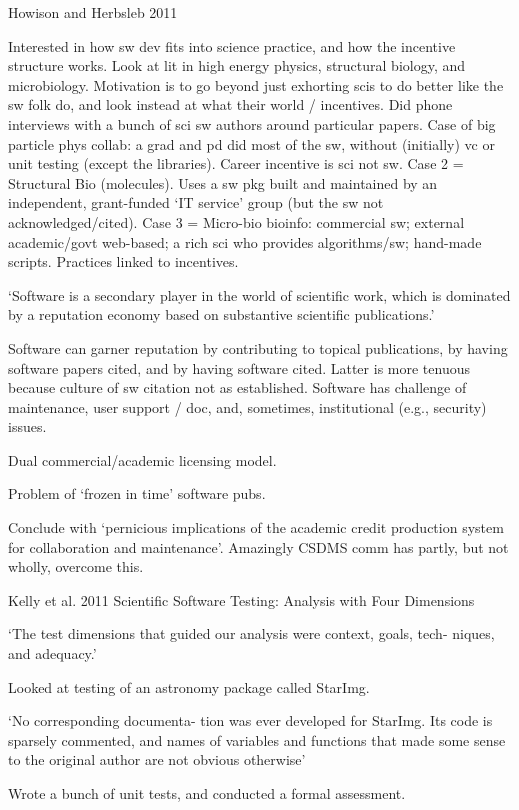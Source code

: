 \documentclass[12pt]{amsart}
\begin{document}
Howison and Herbsleb 2011

Interested in how sw dev fits into science practice, and how the incentive structure works. Look at lit in high energy physics, structural biology, and microbiology. Motivation is to go beyond just exhorting scis to do better like the sw folk do, and look instead at what their world / incentives. Did phone interviews with a bunch of sci sw authors around particular papers. Case of big particle phys collab: a grad and pd did most of the sw, without (initially) vc or unit testing (except the libraries). Career incentive is sci not sw. Case 2 = Structural Bio (molecules). Uses a sw pkg built and maintained by an independent, grant-funded `IT service' group (but the sw not acknowledged/cited). Case 3 = Micro-bio bioinfo: commercial sw; external academic/govt web-based; a rich sci who provides algorithms/sw; hand-made scripts. Practices linked to incentives. 

`Software is a secondary player in the world of scientific work, which is dominated by a reputation economy based on substantive scientific publications.'

Software can garner reputation by contributing to topical publications, by having software papers cited, and by having software cited. Latter is more tenuous because culture of sw citation not as established. Software has challenge of maintenance, user support / doc, and, sometimes, institutional (e.g., security) issues. 

Dual commercial/academic licensing model.

Problem of `frozen in time' software pubs.

Conclude with `pernicious implications of the academic credit production system for collaboration and maintenance'. Amazingly CSDMS comm has partly, but not wholly, overcome this.



Kelly et al. 2011 Scientific
Software Testing:
Analysis with
Four Dimensions

`The test dimensions that guided our analysis were context, goals, tech- niques, and adequacy.'

Looked at testing of an astronomy package called StarImg.

`No corresponding documenta- tion was ever developed for StarImg. Its code is sparsely commented, and names of variables and functions that made some sense to the original author are not obvious otherwise'

Wrote a bunch of unit tests, and conducted a formal assessment.
\end{document}
